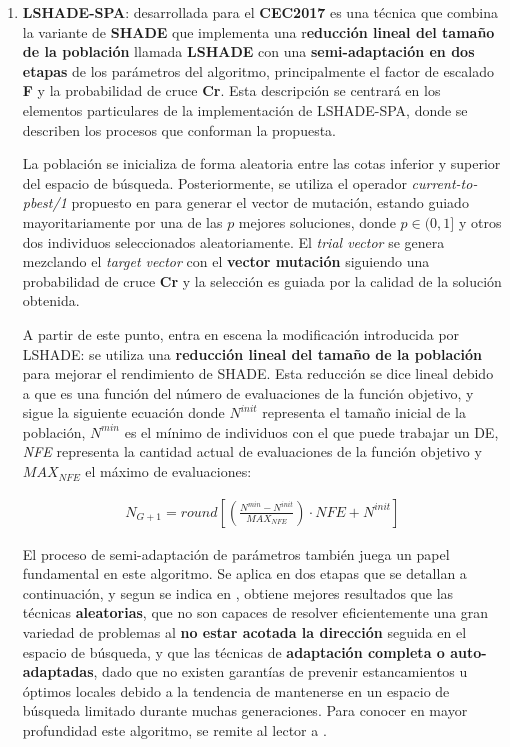 \begin{enumerate}
	
	\item \textbf{LSHADE-SPA}: desarrollada para el \textbf{CEC2017}\cite{LSHADESPA} es una técnica que combina la variante de \textbf{SHADE}\cite{SHADE} que implementa una r\textbf{educción lineal del tamaño de la población} llamada \textbf{LSHADE}\cite{LSHADE} con una \textbf{semi-adaptación en dos etapas} de los parámetros del algoritmo, principalmente el factor de escalado \textbf{F} y la probabilidad de cruce \textbf{Cr}. Esta descripción se centrará en los elementos particulares de la implementación de LSHADE-SPA, donde se describen los procesos que conforman la propuesta.
	
	La población se inicializa de forma aleatoria entre las cotas inferior y superior del espacio de búsqueda. Posteriormente, se utiliza el operador \textit{current-to-pbest/1} propuesto en \cite{JADE} para generar el vector de mutación, estando guiado mayoritariamente por una de las $p$ mejores soluciones, donde $p\in (0,1]$ y otros dos individuos seleccionados aleatoriamente. El \textit{trial vector} se genera mezclando el \textit{target vector} con el \textbf{vector mutación} siguiendo una probabilidad de cruce \textbf{Cr} y la selección es guiada por la calidad de la solución obtenida.
	
	A partir de este punto, entra en escena la modificación introducida por LSHADE: se utiliza una \textbf{reducción lineal del tamaño de la población} para mejorar el rendimiento de SHADE. Esta reducción se dice lineal debido a que es una función del número de evaluaciones de la función objetivo, y sigue la siguiente ecuación donde $ N^{init}$ representa el tamaño inicial de la población, $ N^{min}$ es el mínimo de individuos con el que puede trabajar un DE, \textit{NFE} representa la cantidad actual de evaluaciones de la función objetivo y $MAX_{NFE}$ el máximo de evaluaciones:
	
	\begin{equation}\label{eq:LPSR}
		\begin{gathered}
			N_{G+1} = round[(\frac{N^{min} - N^{init} }{MAX_{NFE} }) \cdot NFE + N^{init}]
		\end{gathered}
	\end{equation}
	
	El proceso de semi-adaptación de parámetros también juega un papel fundamental en este algoritmo. Se aplica en dos etapas que se detallan a continuación, y segun se indica en \cite{LSHADESPA}, obtiene mejores resultados que las técnicas \textbf{aleatorias}, que no son capaces de resolver eficientemente una gran variedad de problemas al \textbf{no estar acotada la dirección} seguida en el espacio de búsqueda, y que las técnicas de \textbf{adaptación completa o auto-adaptadas}, dado que no existen garantías de prevenir estancamientos u óptimos locales debido a la tendencia de mantenerse en un espacio de búsqueda limitado durante muchas generaciones. Para conocer en mayor profundidad este algoritmo, se remite al lector a \cite{LSHADESPA}.


\end{enumerate}
